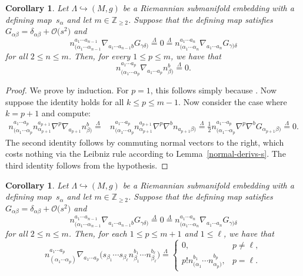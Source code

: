 \documentclass[10pt,a4paper]{article}
\numberwithin{equation}{section}
\newtheorem{Corollary}[Theorem]{Corollary}
\renewcommand{\=}{\stackrel \Lambda =}
\begin{document}
\begin{Corollary} \label{normal-derivs-n}
Let $\Lambda \hookrightarrow (M,g)$ be a Riemannian submanifold embedding with a defining map~$s_{\alpha}$ and let $m \in \mathbb{Z}_{\geq 2}$. Suppose that the defining map satisfies $G_{\alpha \beta} = \delta_{\alpha \beta} + \mathcal{O}\bigl(s^2\bigr)$ and
\[n^{a_1 \cdots a_{n-1}}_{(\alpha_1 \cdots \alpha_{n-1}} \nabla_{a_1 \cdots a_{n-1} b} G_{\gamma \delta)} \= 0 \= n^{a_1 \cdots a_n}_{(\alpha_1 \cdots \alpha_n} \nabla_{a_1 \cdots a_n} G_{\gamma) \delta} \]
for all $2 \leq n \leq m$.
Then, for every $1 \leq p \leq m$, we have that
\[n^{a_1 \cdots a_p}_{(\alpha_1 \cdots \alpha_p} \nabla_{a_1 \cdots a_p} n^b_{\beta)} \= 0 .\]
\end{Corollary}
\begin{proof}
We prove by induction. For $p = 1$, this follows simply because \smash{$n^a_{(\alpha} \nabla_a n^b_{\beta)} \= \beta^b_{(\alpha \beta)} \= 0$}. Now suppose the identity holds for all $k \leq p \leq m-1$. Now consider the case where $k = p+1$ and compute:
\begin{align*}
n^{a_1 \cdots a_p}_{(\alpha_1 \cdots \alpha_p} n^{a_{p+1}}_{\alpha_{p+1}} \nabla^{p} \nabla_{a_{p+1}} n^{b}_{\beta)} \={}& n^{a_1 \cdots a_p}_{(\alpha_1 \cdots \alpha_p} n^{a_{p+1}}_{\alpha_{p+1}} \nabla^{p} \nabla^{b} n_{a_{p+1} \beta)}
\= \frac{1}{2} n^{a_1 \cdots a_p}_{(\alpha_1 \cdots \alpha_p} \nabla^{p} \nabla^{b} G_{\alpha_{p+1} \beta)}
\= 0 .
\end{align*}
The second identity follows by commuting normal vectors to the right, which costs nothing via the Leibniz rule according to Lemma~\ref{normal-derivs-s}. The third identity follows from the hypothesis.
\end{proof}

\begin{Corollary} \label{normal-derivs-sn}
Let $\Lambda \hookrightarrow (M,g)$ be a Riemannian submanifold embedding with a defining map~$s_{\alpha}$ and let $m \in \mathbb{Z}_{\geq 2}$. Suppose that the defining map satisfies $G_{\alpha \beta} = \delta_{\alpha \beta} + \mathcal{O}\bigl(s^2\bigr)$ and
\[n^{a_1 \cdots a_{n-1}}_{(\alpha_1 \cdots \alpha_{n-1}} \nabla_{a_1 \cdots a_{n-1} b} G_{\gamma \delta)} \= 0 \= n^{a_1 \cdots a_n}_{(\alpha_1 \cdots \alpha_n} \nabla_{a_1 \cdots a_n} G_{\gamma) \delta} \]
for all $2 \leq n \leq m$.
Then, for each $1 \leq p \leq m+1$ and $1 \leq \ell$, we have that
\[n^{a_1 \cdots a_p}_{(\alpha_1 \cdots \alpha_p)} \nabla_{a_1 \cdots a_p} \bigl(s_{\beta_1} \cdots s_{\beta_{\ell}} n^{b_1}_{\beta_1} \cdots n^{b_{\ell}}_{\beta_{\ell}}\bigr) \= \begin{cases}
0, & p \neq \ell, \\
p! n^{b_1}_{(\alpha_1} \cdots n^{b_p}_{\alpha_p)}, & p = \ell .
\end{cases}\]
\end{Corollary}
\end{document}
